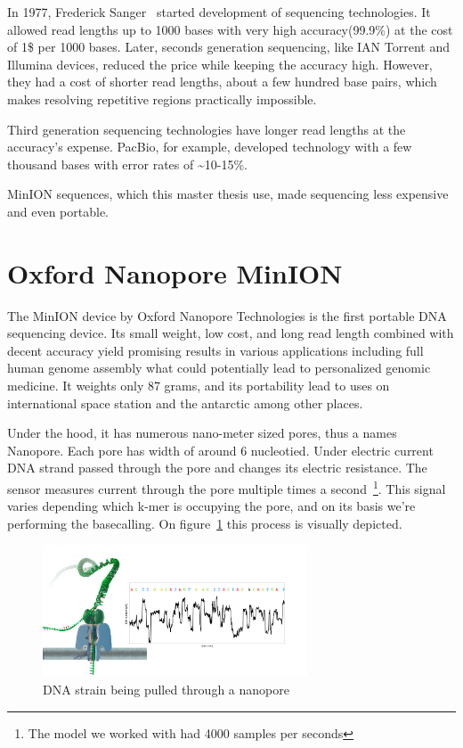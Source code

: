 \documentclass[times, utf8, diplomski, english]{fer}
\begin{document}
In 1977, Frederick Sanger~\citep{mile}\citep{Pettersson2009} started development of sequencing technologies. It allowed read lengths up to 1000 bases with very high accuracy(99.9\%) at the cost of 1\$ per 1000 bases.
Later, seconds generation sequencing, like IAN Torrent and Illumina devices, reduced the price while keeping the accuracy high. However, they had a cost of shorter read lengths, about a few hundred base pairs, which makes resolving repetitive regions practically impossible.

Third generation sequencing technologies have longer read lengths at the accuracy's expense. PacBio, for example, developed technology with a few thousand bases with error rates of \textasciitilde10-15\%. 

MinION sequences, which this master thesis use, made sequencing less expensive and even portable.

\section{Oxford Nanopore MinION}

The MinION device by Oxford Nanopore Technologies is the first portable DNA sequencing device. Its small weight, low cost, and long read length combined with decent accuracy yield promising results in various applications including full human genome assembly \cite{human_seq} what could potentially lead to personalized genomic medicine. It weights only 87 grams, and its portability lead to uses on international space station and the antarctic among other places.

Under the hood, it has numerous nano-meter sized pores, thus a names Nanopore. Each pore has width of around 6 nucleotied. Under electric current DNA strand passed through the pore and changes its electric resistance. The sensor measures current through the pore multiple times a second~\footnote{The model we worked with had 4000 samples per seconds}. This signal varies depending which k-mer is occupying the pore, and on its basis we're performing the basecalling. On figure~\ref{fg:nanopore} this process is visually depicted. 

\begin{figure}[!ht]
    \begin{center}
        \includegraphics[width=0.7\textwidth]{nanopore}
        
        \caption[DNA strain being pulled through a nanopore]{DNA strain being pulled through a nanopore \protect\footnotemark}
        \label{fg:nanopore}
    \end{center}
\end{figure}
\end{document}
